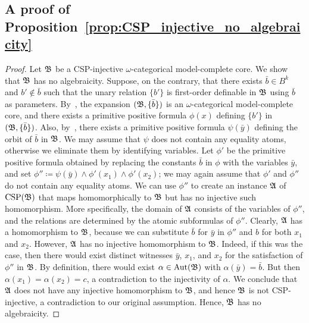  

\subsection{A proof of Proposition~\ref{prop:CSP_injective_no_algebraicity}}

\corealgebraicity*  

\begin{proof} Let $\mathfrak{B}$ be a CSP-injective $\omega$-categorical model-complete core.
%
We show that $\mathfrak{B}$ has no algebraicity.
%
Suppose, on the contrary, that there exists $\bar{b}\in B^k$ and  $b'\notin \bar{b}$ such that the unary relation $\{b'\}$ is first-order definable in $\mathfrak{B}$ using $\bar{b}$ as parameters.
%
By~\cite[Theorem~4.5.1 and Lemma~4.5.5]{bodirsky2021complexity}, the expansion $(\mathfrak{B},\{\bar{b}\})$ is an $\omega$-categorical model-complete core, and there exists a primitive positive formula $\phi(x)$ defining $\{b'\}$ in $(\mathfrak{B},\{\bar{b}\})$.
%
Also, by~\cite[Theorem~4.5.1]{bodirsky2021complexity}, there exists a primitive positive formula $\psi(\bar{y})$ defining the orbit of $\bar{b}$ in $\mathfrak{B}$.
%
We may assume that $\psi$ does not contain any equality atoms, otherwise we eliminate them by identifying variables.
%
Let $\phi'$ be the primitive positive formula obtained by replacing the constants $\bar{b}$ in $\phi$ with the variables $\bar{y}$, and set $\phi'' \coloneqq   \psi(\bar{y}) \wedge \phi'(x_1)\wedge \phi'(x_2)$; we may again assume that $\phi'$ and $\phi''$ do not contain any equality atoms. 
% 
 We can use $\phi''$ to create an instance $\mathfrak{A}$ of $\mathrm{CSP}(\mathfrak{B})$ that maps homomorphically to $\mathfrak{B}$ but has no injective such homomorphism.
 More specifically, the domain of $\mathfrak{A}$ consists of the variables of $\phi''$, and the  relations are determined by the atomic subformulas of $\phi''$. 
%  
Clearly, $\mathfrak{A}$ has a homomorphism to $\mathfrak{B}$, because we can substitute $\bar{b}$ for $\bar{y}$ in $\phi''$ and $b$ for both $x_1$ and $x_2$.
%
However, $\mathfrak{A}$ has no injective homomorphism to $\mathfrak{B}$.
%
Indeed, if this was the case, then there would exist distinct witnesses $\bar{y}$, $x_1$, and $x_2$ for the satisfaction of $\phi''$ in $\mathfrak{B}$.
%
By definition, there would exist $\alpha\in \mathrm{Aut}(\mathfrak{B})$ with $\alpha(\bar{y})=\bar{b}$.
%
But then $\alpha(x_1)=\alpha(x_2)=c$, a contradiction to the injectivity of $\alpha$.
%
We conclude that $\mathfrak{A}$ does not have any injective homomorphism to $\mathfrak{B}$, and hence  $\mathfrak{B}$ is not CSP-injective, a contradiction to our original assumption. 
    Hence, $\mathfrak{B}$ has no algebraicity.
\end{proof} 


